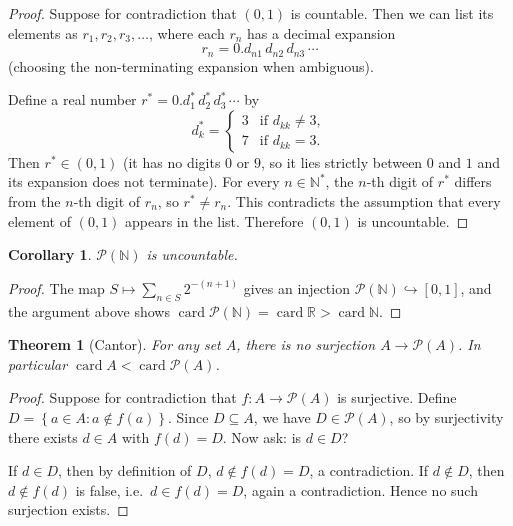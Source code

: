 \documentclass[12pt,a4paper,openany]{book}
\theoremstyle{definition}
\theoremstyle{plain}
\newtheorem{theorem}[definition]{Theorem}
\newtheorem{corollary}[definition]{Corollary}
\theoremstyle{remark}
\newcommand{\N}{\mathbb{N}}
\newcommand{\R}{\mathbb{R}}
\newcommand{\set}[1]{\left\{#1\right\}}
\newcommand{\powerset}{\mathcal{P}}
\DeclareMathOperator{\card}{card}
\begin{document}
\begin{proof}
Suppose for contradiction that $(0,1)$ is countable. Then we can list its
elements as $r_1, r_2, r_3, \ldots$, where each $r_n$ has a decimal
expansion
\[
  r_n = 0.d_{n1}\, d_{n2}\, d_{n3}\, \cdots
\]
(choosing the non-terminating expansion when ambiguous).

Define a real number $r^{*} = 0.d_1^{*}\, d_2^{*}\, d_3^{*}\, \cdots$ by
\[
  d_k^{*} = \begin{cases}
    3 & \text{if } d_{kk} \neq 3, \\
    7 & \text{if } d_{kk} = 3.
  \end{cases}
\]
Then $r^{*} \in (0,1)$ (it has no digits $0$ or $9$, so it lies strictly
between $0$ and $1$ and its expansion does not terminate). For every
$n \in \N^{*}$, the $n$-th digit of $r^{*}$ differs from the $n$-th digit
of $r_n$, so $r^{*} \neq r_n$. This contradicts the assumption that every
element of $(0,1)$ appears in the list. Therefore $(0,1)$ is uncountable.
\end{proof}

\begin{corollary}\label{cor:powerset-N-uncountable}
$\powerset(\N)$ is uncountable.
\end{corollary}

\begin{proof}
The map $S \mapsto \sum_{n \in S} 2^{-(n+1)}$ gives an injection
$\powerset(\N) \hookrightarrow [0,1]$, and the argument above shows
$\card{\powerset(\N)} = \card{\R} > \card{\N}$.
\end{proof}

\begin{theorem}[Cantor]\label{thm:cantor-powerset}
For any set $A$, there is no surjection $A \to \powerset(A)$.
In particular $\card{A} < \card{\powerset(A)}$.
\end{theorem}

\begin{proof}
Suppose for contradiction that $f\colon A \to \powerset(A)$ is surjective.
Define $D = \set{a \in A : a \notin f(a)}$. Since $D \subseteq A$, we have
$D \in \powerset(A)$, so by surjectivity there exists $d \in A$ with
$f(d) = D$. Now ask: is $d \in D$?

If $d \in D$, then by definition of $D$, $d \notin f(d) = D$, a
contradiction. If $d \notin D$, then $d \notin f(d)$ is false, i.e.\
$d \in f(d) = D$, again a contradiction. Hence no such surjection exists.
\end{proof}
\end{document}
